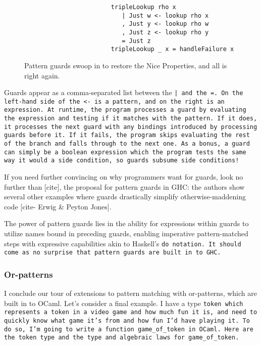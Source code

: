 \documentclass[manuscript,screen,review, 12pt, nonacm]{acmart}
\begin{document}
\begin{outline}[enumerate]
    \begin{figure}[hbt!]  
        \begin{center}
        \begin{verbatim}
                        tripleLookup rho x
                           | Just w <- lookup rho x
                           , Just y <- lookup rho w
                           , Just z <- lookup rho y
                           = Just z
                        tripleLookup _ x = handleFailure x
        \end{verbatim}
        \end{center}    
    \caption{Pattern guards swoop in to restore the Nice Properties, and all is
    right again.} 
    \label{fig:guardtriplelookup}
    \end{figure}

    Guards appear as a comma-separated list between the \tt{|} and the \tt{=}.
    On the left-hand side of the \tt{<-} is a pattern, and on the right is an
    expression. At runtime, the program processes a guard by evaluating the
    expression and testing if it matches with the pattern. If it does, it
    processes the next guard with any bindings introduced by processing guards
    before it. If it fails, the program skips evaluating the rest of the branch
    and falls through to the next one. As a bonus, a guard can simply be a
    boolean expression which the program tests the same way it would a side
    condition, so guards subsume side conditions! 
    
    If you need further convincing on why programmers want for guards, look no
    further than [cite], the proposal for pattern guards in GHC: the authors
    show several other examples where guards drastically simplify
    otherwise-maddening code [cite- Erwig \& Peyton Jones]. 
    
    The power of pattern guards lies in the ability for expressions within
    guards to utilize names bound in preceding guards, enabling imperative
    pattern-matched steps with expressive capabilities akin to Haskell's \tt{do}
    notation. It should come as no surprise that pattern guards are built in to
    GHC. 

\subsubsection{Or-patterns}

    I conclude our tour of extensions to pattern matching with or-patterns,
    which are built in to OCaml. Let's consider a final example. I have a type
    \tt{token} which represents a token in a video game and how much fun it is,
    and need to quickly know what game it's from and how fun I'd have playing
    it. To do so, I'm going to write a function \tt{game\_of\_token} in OCaml.
    Here are the \tt{token} type and the type and algebraic laws for
    \tt{game\_of\_token}. 


\end{outline}
\end{document}
